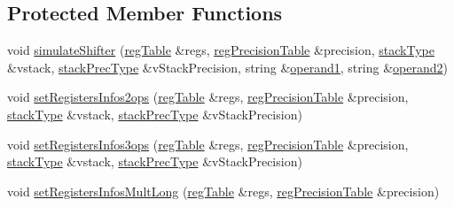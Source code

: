 \subsection*{Protected Member Functions}
\begin{DoxyCompactItemize}
\item 
void \hyperlink{classARM__COMMON_a68cd9533a17558d2e508baaad0a22b9d}{simulate\+Shifter} (\hyperlink{DAAInstruction_8h_af0fae93a861de9cf37988d5673cac523}{reg\+Table} \&regs, \hyperlink{DAAInstruction_8h_a0e8cae02815a5f8adc750122d790b455}{reg\+Precision\+Table} \&precision, \hyperlink{DAAInstruction_8h_a1b0e70ac1a04f06c8132055ed01f589f}{stack\+Type} \&vstack, \hyperlink{DAAInstruction_8h_ac5cb793e9dac3fa9693da78b7e29ab30}{stack\+Prec\+Type} \&v\+Stack\+Precision, string \&\hyperlink{classARM__COMMON_ada8583b1c8914cac40a3c29f40211e68}{operand1}, string \&\hyperlink{classARM__COMMON_a7f35ac57d2949b7c5b255142dab7130f}{operand2})
\item 
void \hyperlink{classARM__COMMON_a74eb150144162a68438cde4911cf96f7}{set\+Registers\+Infos2ops} (\hyperlink{DAAInstruction_8h_af0fae93a861de9cf37988d5673cac523}{reg\+Table} \&regs, \hyperlink{DAAInstruction_8h_a0e8cae02815a5f8adc750122d790b455}{reg\+Precision\+Table} \&precision, \hyperlink{DAAInstruction_8h_a1b0e70ac1a04f06c8132055ed01f589f}{stack\+Type} \&vstack, \hyperlink{DAAInstruction_8h_ac5cb793e9dac3fa9693da78b7e29ab30}{stack\+Prec\+Type} \&v\+Stack\+Precision)
\item 
void \hyperlink{classARM__COMMON_ac80dd82cbedd920afbaddbb021359698}{set\+Registers\+Infos3ops} (\hyperlink{DAAInstruction_8h_af0fae93a861de9cf37988d5673cac523}{reg\+Table} \&regs, \hyperlink{DAAInstruction_8h_a0e8cae02815a5f8adc750122d790b455}{reg\+Precision\+Table} \&precision, \hyperlink{DAAInstruction_8h_a1b0e70ac1a04f06c8132055ed01f589f}{stack\+Type} \&vstack, \hyperlink{DAAInstruction_8h_ac5cb793e9dac3fa9693da78b7e29ab30}{stack\+Prec\+Type} \&v\+Stack\+Precision)
\item 
void \hyperlink{classARM__COMMON_a7c573a648e1b612ce898523608d1ce17}{set\+Registers\+Infos\+Mult\+Long} (\hyperlink{DAAInstruction_8h_af0fae93a861de9cf37988d5673cac523}{reg\+Table} \&regs, \hyperlink{DAAInstruction_8h_a0e8cae02815a5f8adc750122d790b455}{reg\+Precision\+Table} \&precision)
\end{DoxyCompactItemize}
